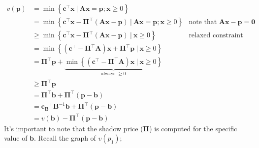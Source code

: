 \documentclass[a4paper, 12pt]{article}
\newcommand{\mat}[1]{\boldsymbol{#1}}
\renewcommand{\vec}[1]{\boldsymbol{#1}}
\begin{document}
                \begin{align*}
                    v(\vec{p}) & = \min \left\{\vec{c}^\top\vec{x}\ |\ \mat{A}\vec{x} = \vec{p}; \vec{x} \geq 0\right\} \\
                    & = \min \left\{\vec{c}^\top\vec{x} - \vec{\Pi}^\top(\mat{A}\vec{x} - \vec{p})\ |\ \mat{A}\vec{x} = \vec{p}; \vec{x} \geq 0\right\} & \text{note that $\mat{A}\vec{x} - \vec{p} = \vec{0}$} \\
                    & \geq \min \left\{\vec{c}^\top\vec{x} - \vec{\Pi}^\top(\mat{A}\vec{x} - \vec{p})\ |\ \vec{x} \geq 0\right\} & \text{relaxed constraint on feasible set} \\
                    & = \min \left\{\left(\vec{c}^\top - \vec{\Pi}^\top\mat{A}\right)\vec{x} + \vec{\Pi}^\top\vec{p}\ |\ \vec{x} \geq 0\right\} \\
                    & = \vec{\Pi}^\top\vec{p} + \underbrace{\min \left\{\left(\vec{c}^\top - \vec{\Pi}^\top\mat{A}\right)\vec{x}\ |\ \vec{x} \geq 0\right\}}_\text{always $\geq 0$} \\
                    & \geq \vec{\Pi}^\top\vec{p} \\
                    & = \vec{\Pi}^\top\vec{b} + \vec{\Pi}^\top(\vec{p} - \vec{b}) \\
                    & = \vec{c_B}^\top\mat{B}^{-1}\vec{b} + \vec{\Pi}^\top(\vec{p} - \vec{b}) \\
                    & = v(\vec{b}) - \vec{\Pi}^\top(\vec{p} - \vec{b})
                \end{align*}
                It's important to note that the shadow price ($\vec{\Pi}$) is computed for the specific value of $\vec{b}$.
                Recall the graph of $v(p_1)$;
\end{document}
